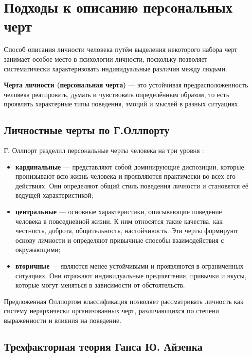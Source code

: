 \chapter{Подходы к описанию персональных черт}

Способ описания личности человека путём выделения некоторого набора черт занимает особое место в психологии личности, поскольку позволяет систематически характеризовать индивидуальные различия между людьми. 

\textbf{Черта личности (персональная черта)} --- это устойчивая предрасположенность человека реагировать, думать и чувствовать определённым образом, то есть проявлять характерные типы поведения, эмоций и мыслей в разных ситуациях \cite{PervinJohn2001Personality}.

\section{Личностные черты по Г.Оллпорту}

Г. Оллпорт разделил персональные черты человека на три уровня \cite{PervinJohn2001Personality}:

\begin{itemize}
	\item \textbf{кардинальные} --- представляют собой доминирующие диспозиции, которые пронизывают всю жизнь человека и проявляются практически во всех его действиях. Они определяют общий стиль поведения личности и становятся её ведущей характеристикой;
	
	\item \textbf{центральные} --- основные характеристики, описывающие поведение человека в повседневной жизни. К ним относятся такие качества, как честность, доброта, общительность, настойчивость. Эти черты формируют основу личности и определяют привычные способы взаимодействия с окружающими;
	
	\item \textbf{вторичные} --- являются менее устойчивыми и проявляются в ограниченных ситуациях. Они отражают индивидуальные предпочтения, привычки и вкусы, которые могут меняться в зависимости от обстоятельств.
\end{itemize}

Предложенная Оллпортом классификация позволяет рассматривать личность как систему иерархически организованных черт, различающихся по степени выраженности и влияния на поведение.

\clearpage

\section{Трехфакторная теория Ганса Ю. Айзенка}

